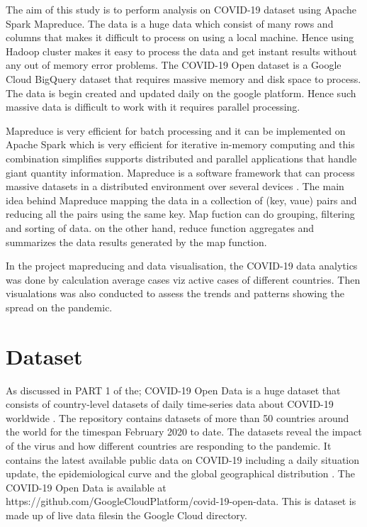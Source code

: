 \documentclass[12pt,letterpaper, twoside]{article}
\begin{document}
The aim of this study is to perform analysis on COVID-19 dataset using Apache Spark Mapreduce. The data is a huge data which consist of many rows and columns that makes it difficult to process on using a local machine. Hence using Hadoop cluster makes it easy to process the data and get instant results without any out of memory error problems. The COVID-19 Open dataset is a Google Cloud BigQuery dataset that requires massive memory and disk space to process. The data is begin created and updated daily on the google platform. Hence such massive data is difficult to work with it requires parallel processing. 

Mapreduce is very efficient for batch processing and it can be implemented on Apache Spark which is very efficient for iterative in-memory computing and this combination simplifies supports distributed and parallel applications that handle giant quantity information. Mapreduce is a software framework  that can process massive datasets in a distributed environment over several devices \cite{}. The main idea behind Mapreduce mapping the data in a collection of (key, vaue) pairs and reducing all the pairs using the same key. Map fuction can do grouping, filtering and sorting of data. on the other hand, reduce function aggregates and summarizes the data results generated by the map function. 

In the project mapreducing and data visualisation, the COVID-19 data analytics was done by calculation average cases viz active cases of different countries. Then visualations was also conducted to assess the trends and patterns showing the spread on the pandemic. 

\section{Dataset}
 As discussed in PART 1 of the;  COVID-19 Open Data is a huge dataset that consists of country-level datasets of daily time-series data about COVID-19 worldwide \cite{covid-19}. The repository contains datasets of more than 50 countries around the world for the timespan February 2020 to date. The datasets reveal the impact of the virus and how different countries are responding to the pandemic.  It contains the latest available public data on COVID-19 including a daily situation update, the epidemiological curve and the global geographical distribution \cite{covid-19}. The COVID-19 Open Data is available at https://github.com/GoogleCloudPlatform/covid-19-open-data. This is dataset is made up of live data filesin the Google Cloud directory.
\end{document}
